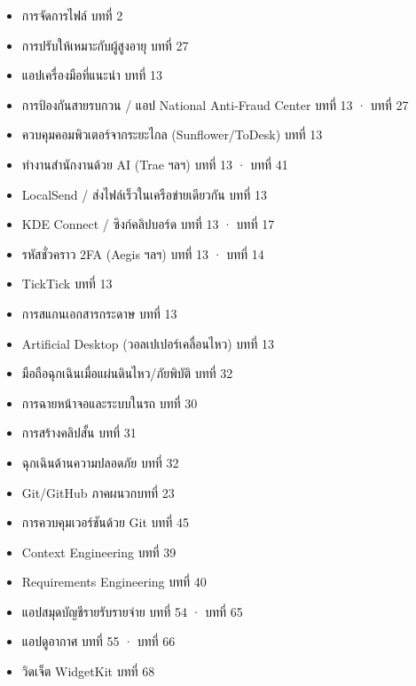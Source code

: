 
\begin{itemize}
  \item การจัดการไฟล์ บทที่ 2
  \item การปรับให้เหมาะกับผู้สูงอายุ บทที่ 27
  \item แอปเครื่องมือที่แนะนำ บทที่ 13
  \item การป้องกันสายรบกวน / แอป National Anti-Fraud Center บทที่ 13 · บทที่ 27
  \item ควบคุมคอมพิวเตอร์จากระยะไกล (Sunflower/ToDesk) บทที่ 13
  \item ทำงานสำนักงานด้วย AI (Trae ฯลฯ) บทที่ 13 · บทที่ 41
  \item LocalSend / ส่งไฟล์เร็วในเครือข่ายเดียวกัน บทที่ 13
  \item KDE Connect / ซิงก์คลิปบอร์ด บทที่ 13 · บทที่ 17
  \item รหัสชั่วคราว 2FA (Aegis ฯลฯ) บทที่ 13 · บทที่ 14
  \item TickTick บทที่ 13
  \item การสแกนเอกสารกระดาษ บทที่ 13
  \item Artificial Desktop (วอลเปเปอร์เคลื่อนไหว) บทที่ 13
  \item มือถือฉุกเฉินเมื่อแผ่นดินไหว/ภัยพิบัติ บทที่ 32
  \item การฉายหน้าจอและระบบในรถ บทที่ 30
  \item การสร้างคลิปสั้น บทที่ 31
  \item ฉุกเฉินด้านความปลอดภัย บทที่ 32
  \item Git/GitHub ภาคผนวกบทที่ 23
  \item การควบคุมเวอร์ชันด้วย Git บทที่ 45
  \item Context Engineering บทที่ 39
  \item Requirements Engineering บทที่ 40
  \item แอปสมุดบัญชีรายรับรายจ่าย บทที่ 54 · บทที่ 65
  \item แอปดูอากาศ บทที่ 55 · บทที่ 66
  \item วิดเจ็ต WidgetKit บทที่ 68
\end{itemize}
